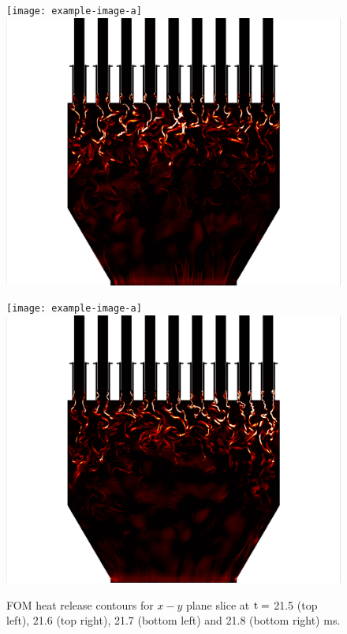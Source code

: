 \begin{figure}
	\begin{minipage}{0.49\linewidth}
		\ifdefined\DRAFT
			\texttt{[image: example-image-a]}
		\else
			\includegraphics[width=0.99\linewidth,trim={0.5em 0em 6cm 0em},clip]{Chapters/NineElement/Images/example_snaps/example_heat_z_217000.png}
		\fi
	\end{minipage}
	\begin{minipage}{0.49\linewidth}
		\ifdefined\DRAFT
			\texttt{[image: example-image-a]}
		\else
			\includegraphics[width=0.99\linewidth,trim={6cm 0em 0.5em 0em},clip]{Chapters/NineElement/Images/example_snaps/example_heat_z_218000.png}
		\fi
	\end{minipage}
	\caption{\label{fig:nineElemFOMHeat}FOM heat release contours for $x-y$ plane slice at $\text{t} = $ 21.5 (top left), 21.6 (top right), 21.7 (bottom left) and 21.8 (bottom right) ms.}
\end{figure}

